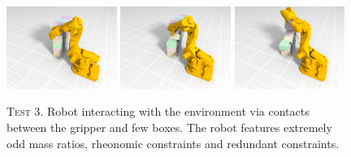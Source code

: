 \documentclass[final,3p]{elsarticle}
\begin{document}
\begin{figure}[!tbp]
  \centering
	\includegraphics[width=0.32\textwidth]{pics/robot_80.png}
  \includegraphics[width=0.32\textwidth]{pics/robot_200.png}
	\includegraphics[width=0.32\textwidth]{pics/robot_280.png}
	\hfill
  \caption{\textsc{Test 3}. Robot interacting with the environment via contacts between the gripper and few boxes. The robot features extremely odd mass ratios, rheonomic constraints and redundant constraints.}
	\label{fig:robot}
\end{figure}
\end{document}
